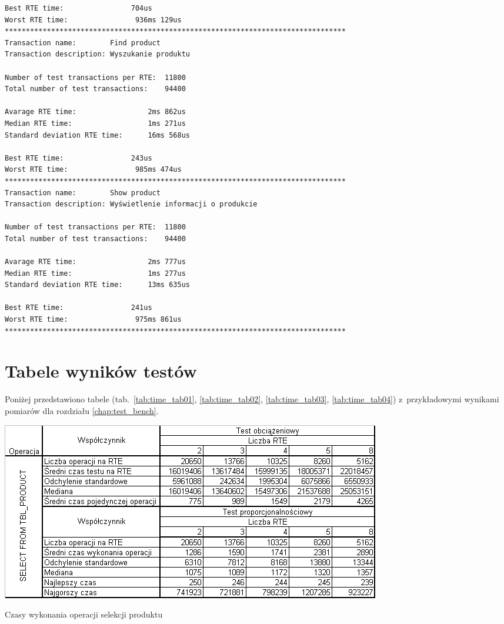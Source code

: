 \begin{Verbatim}
Best RTE time:                704us
Worst RTE time:                936ms 129us
*********************************************************************************
Transaction name:        Find product
Transaction description: Wyszukanie produktu

Number of test transactions per RTE:  11800
Total number of test transactions:    94400

Avarage RTE time:                 2ms 862us
Median RTE time:                  1ms 271us
Standard deviation RTE time:      16ms 568us

Best RTE time:                243us
Worst RTE time:                985ms 474us
*********************************************************************************
Transaction name:        Show product
Transaction description: Wyświetlenie informacji o produkcie

Number of test transactions per RTE:  11800
Total number of test transactions:    94400

Avarage RTE time:                 2ms 777us
Median RTE time:                  1ms 277us
Standard deviation RTE time:      13ms 635us

Best RTE time:                241us
Worst RTE time:                975ms 861us
*********************************************************************************
\end{Verbatim}

\section{Tabele wyników testów}
Poniżej przedstawiono tabele (tab.~\ref{tab:time_tab01}, \ref{tab:time_tab02}, 
\ref{tab:time_tab03}, \ref{tab:time_tab04}) z~przykładowymi wynikami pomiarów 
dla rozdziału \ref{chap:test_bench}.

\begin{table}[h]
\begin{center}
\includegraphics[width=0.9\linewidth]{figures/time_tab01.png}
\end{center}
\caption{Czasy wykonania operacji selekcji produktu}\label{tab:time_tab01}
\end{table}


